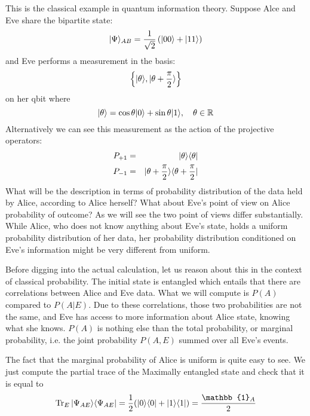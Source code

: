 \begin{example}
	This is the classical example in quantum information theory. Suppose Alce and Eve share the bipartite state:
	\begin{equation}
		\lvert\Psi\rangle_{AB} = \frac{1}{\sqrt{2}} \left(\lvert00\rangle + \lvert11\rangle\right)
		\label{eq:MaxEntangledState}
	\end{equation}
	and Eve performs a measurement in the basis:
	\begin{equation}
		\left\{ \lvert\theta\rangle,  \lvert\theta + \frac{\pi}{2}\rangle\right\}
		\label{eq:thetabasis}
	\end{equation}
	on her qbit where
	\begin{equation}
		\lvert\theta\rangle = \cos{\theta}\lvert0\rangle + \sin{\theta}\lvert1\rangle,  \hspace{10pt} \theta \in \mathbb{R}
	\end{equation}
	Alternatively we can see this measurement as the action of the projective operators:
	\begin{eqnarray}
		P_{+1} &=& \lvert\theta\rangle \langle\theta\rvert \\
		P_{-1} &=& \lvert\theta + \frac{\pi}{2}\rangle \langle\theta + \frac{\pi}{2}\rvert
	\end{eqnarray}
	What will be the description in terms of probability distribution of the data held by Alice, according to Alice herself? What about Eve's point of view on Alice probability of outcome?
	As we will see the two point of views differ substantially. While Alice, who does not know anything about Eve's state, holds a uniform probability distribution of her data, her probability distribution conditioned on Eve's information might be very different from uniform.

	Before digging into the actual calculation, let us reason about this in the context of classical probability. The initial state is entangled which entails that there are correlations between Alice and Eve data. What we will compute is $P(A)$ compared to $P(A|E)$. Due to these correlations, those two probabilities are not the same, and Eve has access to more information about Alice state, knowing what she knows. $P(A)$ is nothing else than the total probability, or marginal probability, i.e. the joint probability $P(A,E)$ summed over all Eve's events.

	The fact that the marginal probability of Alice is uniform is quite easy to see. We just compute the partial trace of the Maximally entangled state and check that it is equal to $$\Tr_E{\ket{\Psi_{AE}}\bra{\Psi_{AE}}} = \frac{1}{2} (\density{0}{0} + \density{1}{1}) = \frac{\mathbb{1}_A}{2}$$


\end{example}
